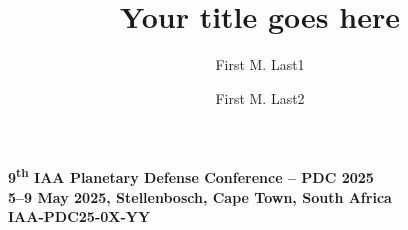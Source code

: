\documentclass[final,1p,times]{elsarticle}
\begin{document}
\begin{frontmatter}

\begin{center}
\small \textbf{9\textsuperscript{th} IAA Planetary Defense Conference -- PDC 2025} \\ \textbf{5--9 May 2025, Stellenbosch, Cape Town, South Africa} \\ \vspace{0.1in} \textbf{IAA-PDC25-0X-YY} \\
\end{center}

\title{Your title goes here}  %


\author[fml1]{First M. Last1}
\author[fml2]{First M. Last2}


\address[fml1]{Institution1, Mail Stop1, Street Address1, City1, State1, Zip Code1, Country1, phone number1}
\address[fml2]{Institution2, Mail Stop2, Street Address2, City2, State2, Zip Code2, Country2, phone number2}






\end{frontmatter}

%
%









\vspace{0.25in}

%
%

\end{document}
